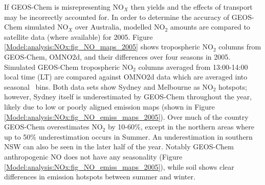     If GEOS-Chem is misrepresenting NO$_X$ then yields and the effects of transport may be incorrectly accounted for.
    In order to determine the accuracy of GEOS-Chem simulated NO$_X$ over Australia, modelled NO$_2$ amounts are compared to satellite data (where available) for 2005.
    Figure \ref{Model:analysis:NOx:fig_NO_maps_2005} shows tropospheric NO$_2$ columns from GEOS-Chem, OMNO2d, and their differences over four seasons in 2005.
    Simulated GEOS-Chem tropospheric NO$_2$ columns averaged from 13:00-14:00 local time (LT) are compared against OMNO2d data which are averaged into seasonal \lowhr ~bins. %
    Both data sets show Sydney and Melbourne as NO$_2$ hotspots; however, Sydney itself is underestimated by GEOS-Chem throughout the year, likely due to low or poorly aligned emission maps (shown in Figure \ref{Model:analysis:NOx:fig_NO_emiss_maps_2005}).
    Over much of the country GEOS-Chem overestimates NO$_2$ by 10-60\%, except in the northern areas where up to 50\% underestimation occurs in Summer.
    An underestimation in southern NSW can also be seen in the later half of the year.
    Notably GEOS-Chem anthropogenic NO does not have any seasonality (Figure \ref{Model:analysis:NOx:fig_NO_emiss_maps_2005}), while soil shows clear differences in emission hotspots between summer and winter.
      
    
    
